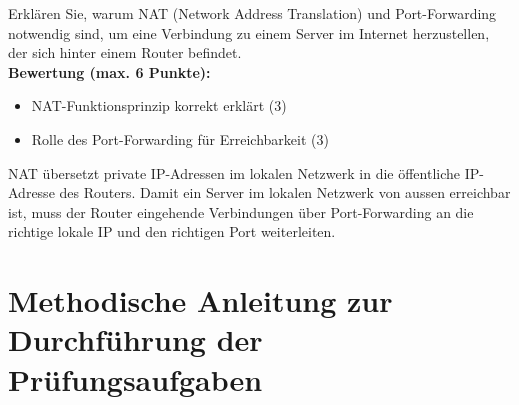 \begin{myexercise}

    Erklären Sie, warum NAT (Network Address Translation) und Port-Forwarding notwendig sind, um eine Verbindung zu einem Server im Internet herzustellen, der sich hinter einem Router befindet.
    \\[.5cm]
    \textbf{Bewertung (max. 6 Punkte):}
    \begin{itemize}
        \item NAT-Funktionsprinzip korrekt erklärt (3)
        \item Rolle des Port-Forwarding für Erreichbarkeit (3)
    \end{itemize}

    \begin{myanswer}
        NAT übersetzt private IP-Adressen im lokalen Netzwerk in die öffentliche IP-Adresse des Routers. Damit ein Server im lokalen Netzwerk von aussen erreichbar ist, muss der Router eingehende Verbindungen über Port-Forwarding an die richtige lokale IP und den richtigen Port weiterleiten.
    \end{myanswer}
\end{myexercise}

\chapter{Methodische Anleitung zur Durchführung der Prüfungsaufgaben}

